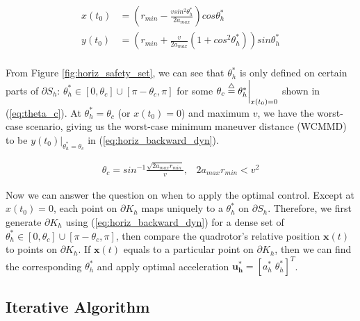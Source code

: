 \documentclass[journal,11pt,onecolumn,draftclsnofoot,]{IEEEtran}
\begin{document}
\begin{equation}
\label{eq:horiz_backward_dyn}
\begin{split}
x(t_0) &= \left( r_{min} - \frac{vsin^2\theta_h^*}{2a_{max}} \right) cos\theta_h^* \\
y(t_0) &= \left( r_{min} + \frac{v}{2a_{max}} \left( 1+cos^2\theta_h^* \right) \right) sin\theta_h^* \\
\end{split}
\end{equation}


From Figure \ref{fig:horiz_safety_set}, we can see that $\theta_h^*$ is only defined on certain parts of $\partial S_h$: $\theta_h^*\in[0,\theta_c] \cup [\pi-\theta_c,\pi]$ for some $\theta_c \buildrel\triangle\over = \theta_h^* \bigg|_{x(t_0)=0}$ shown in (\ref{eq:theta_c}). At $\theta_h^*=\theta_c$ (or $x(t_0)=0$) and maximum $v$, we have the worst-case scenario, giving us the worst-case minimum maneuver distance (WCMMD) to be $y(t_0) \bigg|_{\theta_h^*=\theta_c}$ in (\ref{eq:horiz_backward_dyn}).

\begin{equation}
\label{eq:theta_c}
\begin{split}
\theta_c = sin^{-1}\frac{\sqrt{2a_{max}r_{min}}}{v}, \;\;\; 2a_{max}r_{min}<v^2
\end{split}
\end{equation}

Now we can answer the question on when to apply the optimal control. Except at $x(t_0)=0$, each point on $\partial K_h$ maps uniquely to a $\theta_h^*$ on $\partial S_h$. Therefore, we first generate $\partial K_h$ using (\ref{eq:horiz_backward_dyn}) for a dense set of $\theta_h^*\in[0,\theta_c] \cup [\pi-\theta_c,\pi]$, then compare the quadrotor's relative position $\boldsymbol{x}(t)$ to points on $\partial K_h$. If $\boldsymbol{x}(t)$  equals to a particular point on $\partial K_h$, then we can find the corresponding $\theta_h^*$ and apply  optimal acceleration $\boldsymbol{u_h^*}=[a_h^* \; \theta_h^* ]^T$. 

\subsection{Iterative Algorithm} \label{sec:iter_alg}
\end{document}
